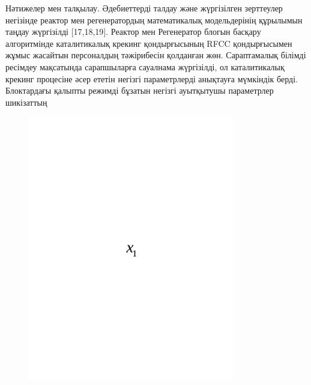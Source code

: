 Нәтижелер мен талқылау. Әдебиеттерді талдау және жүргізілген зерттеулер
негізінде реактор мен регенератордың математикалық модельдерінің
құрылымын таңдау жүргізілді {[}17,18,19{]}. Реактор мен Регенератор
блогын басқару алгоритмінде каталитикалық крекинг қондырғысының RFCC
қондырғысымен жұмыс жасайтын персоналдың тәжірибесін қолданған жөн.
Сараптамалық білімді ресімдеу мақсатында сарапшыларға сауалнама
жүргізілді, ол каталитикалық крекинг процесіне әсер ететін негізгі
параметрлерді анықтауға мүмкіндік берді. Блоктардағы қалыпты режимді
бұзатын негізгі ауытқытушы параметрлер шикізаттың
\begin{figure}[H]
	\centering
	\includegraphics[width=0.8\textwidth]{media/ict/image87}
	\caption*{}
\end{figure}


